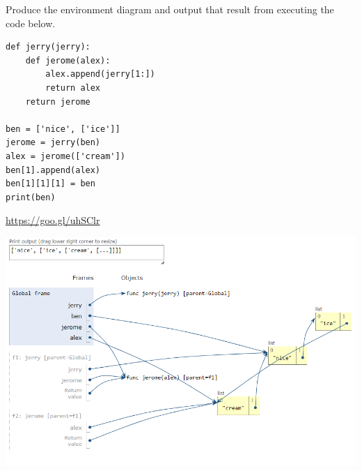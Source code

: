 \begin{blocksection}
\question Produce the environment diagram and output that result from executing the code below.
\begin{lstlisting}
def jerry(jerry):
    def jerome(alex):
        alex.append(jerry[1:])
        return alex
    return jerome
			
ben = ['nice', ['ice']]
jerome = jerry(ben)
alex = jerome(['cream'])
ben[1].append(alex)
ben[1][1][1] = ben
print(ben)
\end{lstlisting}

\begin{solution}[1.5in]
\url{https://goo.gl/uhSClr}

\includegraphics[width=\textwidth]{nice-ice-cream.png}
\end{solution}
\end{blocksection}
